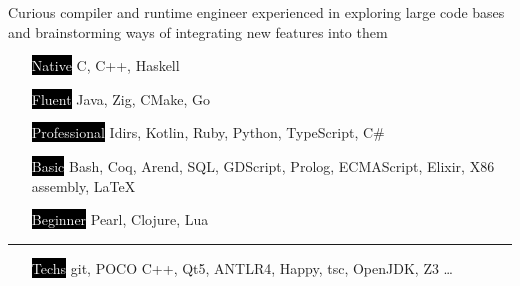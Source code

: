 \documentclass[9pt]{template/developercv}
\begin{document}
\begin{minipage}[t]{0.35\textwidth}
	\vspace{-\baselineskip}

	Curious compiler and runtime engineer experienced in exploring large code bases and brainstorming ways of integrating new features into them\\
	\bio
\end{minipage}
\hfill
\begin{minipage}[t]{0.55\textwidth}
	\vspace{-\baselineskip}
	\vspace{-0.5\baselineskip}

	\begin{itemize}
		\setlength{\itemsep}{0pt}
		\setlength{\parskip}{0.0\baselineskip}
    \setlength{\parsep}{0pt}
		\item[\colorbox{black}{\textcolor{white}{Native}}] C, C++, Haskell
		\item[\colorbox{black}{\textcolor{white}{Fluent}}] Java, Zig, CMake, Go
		\item[\colorbox{black}{\textcolor{white}{Professional}}] Idirs, Kotlin, Ruby, Python, TypeScript, C\#
		\item[\colorbox{black}{\textcolor{white}{Basic}}] Bash, Coq, Arend, SQL, GDScript, Prolog, ECMAScript, Elixir, X86 assembly, \LaTeX
		\item[\colorbox{black}{\textcolor{white}{Beginner}}] Pearl, Clojure, Lua
	\end{itemize}
	\vspace{-0.5\baselineskip}
	\noindent\hspace{-0.1\textwidth}\rule{1.1\textwidth}{0.4pt}
	\begin{itemize}
		\setlength{\itemsep}{0pt}
		\setlength{\parskip}{0.0\baselineskip}
	\setlength{\parsep}{0pt}
		\item[\colorbox{black}{\textcolor{white}{Techs}}] git, POCO C++, Qt5, ANTLR4, Happy, tsc, OpenJDK, Z3 \dots
	\end{itemize}
\end{minipage}


\end{document}
